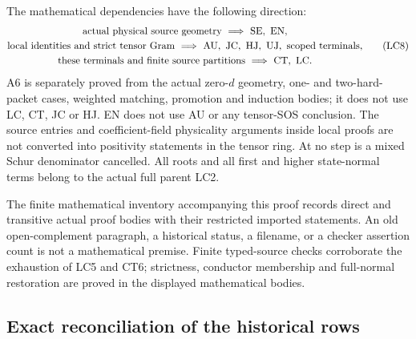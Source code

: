The mathematical dependencies have the following direction:
\[
\begin{gathered}
 \text{actual physical source geometry}
       \ \Longrightarrow\ {\rm SE,\ EN},\\
 \text{local identities and strict tensor Gram}
       \ \Longrightarrow\ {\rm AU,\ JC,\ HJ,\ UJ},
       \ \text{scoped terminals},\\
 \text{these terminals and finite source partitions}
       \ \Longrightarrow\ {\rm CT,\ LC}.
\end{gathered}\tag{LC8}
\]
A6 is separately proved from the actual zero-\(d\) geometry,
one- and two-hard-packet cases, weighted matching, promotion
and induction bodies; it does not use LC, CT, JC or HJ.
EN does not use AU or any tensor-SOS conclusion.
The source entries and coefficient-field physicality arguments
inside local proofs are not converted into positivity
statements in the tensor ring.
At no step is a mixed Schur denominator cancelled.
All roots and all first and higher state-normal terms belong
to the actual full parent LC2.

The finite mathematical inventory accompanying this proof
records direct and transitive actual proof bodies with their
restricted imported statements.  An old open-complement
paragraph, a historical status, a filename, or a checker
assertion count is not a mathematical premise.
Finite typed-source checks corroborate the exhaustion of
LC5 and CT6; strictness, conductor membership and full-normal
restoration are proved in the displayed mathematical bodies.

\subsection{Exact reconciliation of the historical rows}

